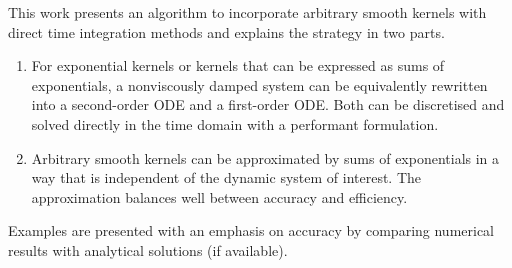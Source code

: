 This work presents an algorithm to incorporate arbitrary smooth kernels with direct time integration methods and explains the strategy in two parts.
\begin{enumerate}
\item[\secref{sec:single}] For exponential kernels or kernels that can be expressed as sums of exponentials, a nonviscously damped system can be equivalently rewritten into a second-order ODE and a first-order ODE. Both can be discretised and solved directly in the time domain with a performant formulation.
\item[\secref{sec:arbitrary}] Arbitrary smooth kernels can be approximated by sums of exponentials in a way that is independent of the dynamic system of interest. The approximation balances well between accuracy and efficiency.
\end{enumerate}
Examples are presented with an emphasis on accuracy by comparing numerical results with analytical solutions (if available).
